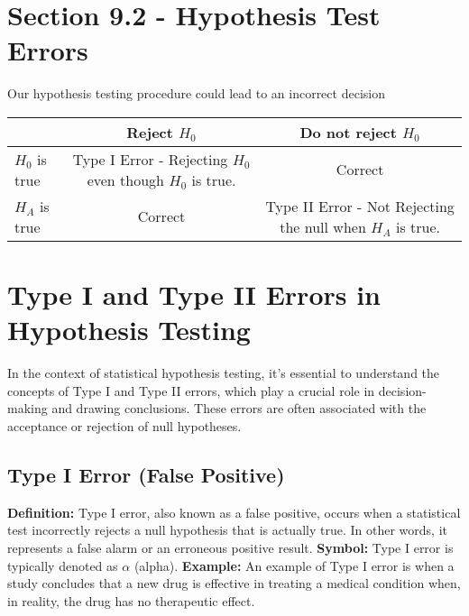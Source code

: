 \documentclass{report}
\begin{document}
\section*{Section 9.2 - Hypothesis Test Errors}
Our hypothesis testing procedure could lead to an incorrect decision
\bigbreak \noindent

\begin{table}[ht]
  \centering
  \renewcommand{\arraystretch}{1.5}
  \begin{tabular}{l|c|c}
    \toprule
    \textbf{ } & \textbf{Reject $H_0$} & \textbf{Do not reject $H_0$} \\
    \hline
    \midrule
    $H_0$ is true &  \parbox{5.5cm}{\vspace{0.5cm}  Type I Error - Rejecting $H_0$ even though $H_0$ is true.} &  \parbox{5.5cm}{\vspace{0.5cm} \centerline{Correct}} \\
    \hline
    $H_A$ is true &  \parbox{4cm}{\vspace{0.5cm}  \centerline{Correct}} &  \parbox{5.5cm}{\vspace{0.5cm} Type II Error - Not Rejecting the null when $H_A$ is true.} \\
    \hline
    \bottomrule
  \end{tabular}
\end{table}
\section{Type I and Type II Errors in Hypothesis Testing}

\vspace{10pt}
In the context of statistical hypothesis testing, it's essential to understand the concepts of Type I and Type II errors, which play a crucial role in decision-making and drawing conclusions. These errors are often associated with the acceptance or rejection of null hypotheses.
\vspace{10pt}

\subsection{Type I Error (False Positive)}

\vspace{10pt}
\textbf{Definition:} Type I error, also known as a false positive, occurs when a statistical test incorrectly rejects a null hypothesis that is actually true. In other words, it represents a false alarm or an erroneous positive result.
\bigbreak \noindent
\textbf{Symbol:} Type I error is typically denoted as $\alpha$ (alpha).
\bigbreak \noindent
\textbf{Example:} An example of Type I error is when a study concludes that a new drug is effective in treating a medical condition when, in reality, the drug has no therapeutic effect.
\vspace{3mm}
\end{document}
